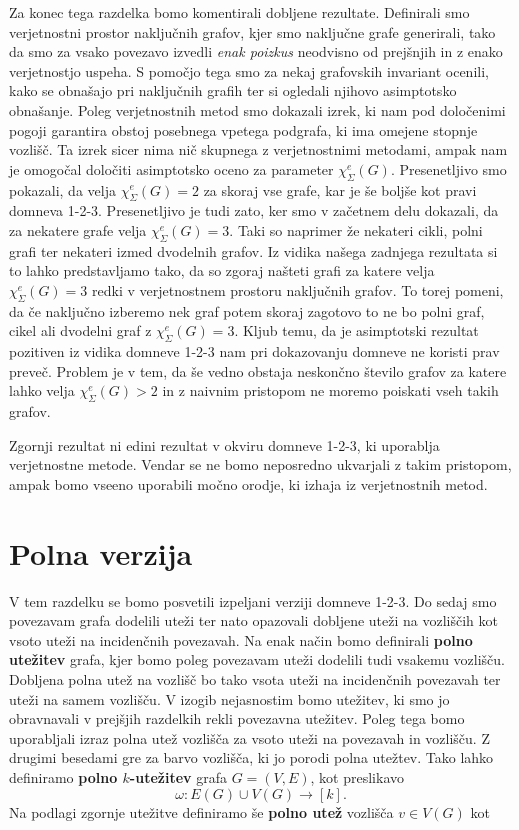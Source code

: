 \documentclass[12pt,a4paper,twoside]{article}
\theoremstyle{definition} %
\theoremstyle{plain} %
\newcommand{\ec}{\chi_{\Sigma}^e}
\numberwithin{equation}{section}  %
\begin{document}
Za konec tega razdelka bomo komentirali dobljene rezultate. Definirali smo verjetnostni prostor naključnih grafov, kjer smo naključne grafe generirali, tako da smo za vsako povezavo izvedli \textit{enak poizkus} neodvisno od prejšnjih in z enako verjetnostjo uspeha. S pomočjo tega smo za nekaj grafovskih invariant ocenili, kako se obnašajo pri naključnih grafih ter si ogledali njihovo asimptotsko obnašanje. Poleg verjetnostnih metod smo dokazali izrek, ki nam pod določenimi pogoji garantira obstoj posebnega vpetega podgrafa, ki ima omejene stopnje vozlišč. Ta izrek sicer nima nič skupnega z verjetnostnimi metodami, ampak nam je omogočal določiti asimptotsko oceno za parameter $\ec(G)$. Presenetljivo smo pokazali, da velja $\ec(G) = 2$ za skoraj vse grafe, kar je še boljše kot pravi domneva 1-2-3. Presenetljivo je tudi zato, ker smo v začetnem delu dokazali, da za nekatere grafe velja $\ec(G) = 3$. Taki so naprimer že nekateri cikli, polni grafi ter nekateri izmed dvodelnih grafov. Iz vidika našega zadnjega rezultata si to lahko predstavljamo tako, da so zgoraj našteti grafi za katere velja $\ec(G) = 3$ redki v verjetnostnem prostoru naključnih grafov. To torej pomeni, da če naključno izberemo nek graf potem skoraj zagotovo to ne bo polni graf, cikel ali dvodelni graf z $\ec(G) = 3$. Kljub temu, da je asimptotski rezultat pozitiven iz vidika domneve 1-2-3 nam pri dokazovanju domneve ne koristi prav preveč. Problem je v tem, da še vedno obstaja neskončno število grafov za katere lahko velja $\ec(G) > 2$ in z naivnim pristopom ne moremo poiskati vseh takih grafov.

Zgornji rezultat ni edini rezultat v okviru domneve 1-2-3, ki uporablja verjetnostne metode. Vendar se ne bomo neposredno ukvarjali z takim pristopom, ampak bomo vseeno uporabili močno orodje, ki izhaja iz verjetnostnih metod.

\section{Polna verzija}
V tem razdelku se bomo posvetili izpeljani verziji domneve 1-2-3. Do sedaj smo povezavam grafa dodelili uteži ter nato opazovali dobljene uteži na vozliščih kot vsoto uteži na incidenčnih povezavah. Na enak način bomo definirali \textbf{polno utežitev} grafa, kjer bomo poleg povezavam uteži dodelili tudi vsakemu vozlišču. Dobljena polna utež na vozlišč bo tako vsota uteži na incidenčnih povezavah ter uteži na samem vozlišču. V izogib nejasnostim bomo utežitev, ki smo jo obravnavali v prejšjih razdelkih rekli povezavna utežitev. Poleg tega bomo uporabljali izraz polna utež vozlišča za vsoto uteži na povezavah in vozlišču. Z drugimi besedami gre za barvo vozlišča, ki jo porodi polna utežtev. Tako lahko definiramo \textbf{polno $k$-utežitev} grafa $G=(V,E)$, kot preslikavo
$$ \omega : E(G) \cup V(G) \rightarrow [k]. $$
Na podlagi zgornje utežitve definiramo še \textbf{polno utež} vozlišča $v \in V(G)$ kot
\end{document}
